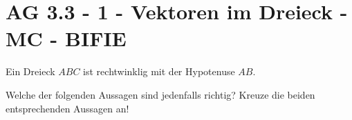 \section{AG 3.3 - 1 - Vektoren im Dreieck - MC - BIFIE}

\begin{beispiel}[AG 3.3]{1} %
		Ein Dreieck $ABC$ ist rechtwinklig mit der Hypotenuse $AB$.
	
	Welche der folgenden Aussagen sind jedenfalls richtig? Kreuze die beiden entsprechenden Aussagen an!
\end{beispiel}